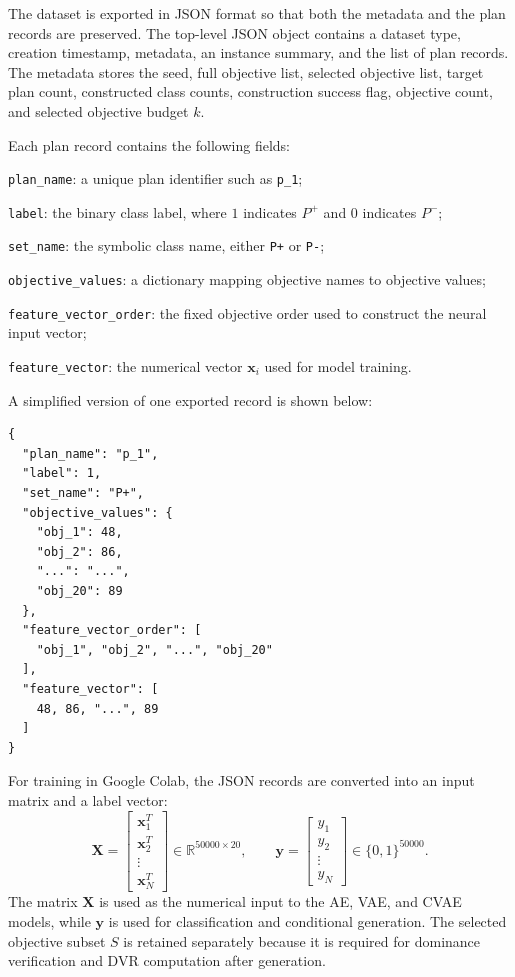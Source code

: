The dataset is exported in JSON format so that both the metadata and the plan records are preserved. The top-level JSON object contains a dataset type, creation timestamp, metadata, an instance summary, and the list of plan records. The metadata stores the seed, full objective list, selected objective list, target plan count, constructed class counts, construction success flag, objective count, and selected objective budget $k$.

Each plan record contains the following fields:
\begin{compactitem}
    \item \texttt{plan\_name}: a unique plan identifier such as \texttt{p\_1};
    \item \texttt{label}: the binary class label, where $1$ indicates $P^{+}$ and $0$ indicates $P^{-}$;
    \item \texttt{set\_name}: the symbolic class name, either \texttt{P+} or \texttt{P-};
    \item \texttt{objective\_values}: a dictionary mapping objective names to objective values;
    \item \texttt{feature\_vector\_order}: the fixed objective order used to construct the neural input vector;
    \item \texttt{feature\_vector}: the numerical vector $\mathbf{x}_i$ used for model training.
\end{compactitem}

A simplified version of one exported record is shown below:
\begin{verbatim}
{
  "plan_name": "p_1",
  "label": 1,
  "set_name": "P+",
  "objective_values": {
    "obj_1": 48,
    "obj_2": 86,
    "...": "...",
    "obj_20": 89
  },
  "feature_vector_order": [
    "obj_1", "obj_2", "...", "obj_20"
  ],
  "feature_vector": [
    48, 86, "...", 89
  ]
}
\end{verbatim}

For training in Google Colab, the JSON records are converted into an input matrix and a label vector:
\begin{equation}
    \mathbf{X}
    =
    \begin{bmatrix}
        \mathbf{x}_1^{T} \\
        \mathbf{x}_2^{T} \\
        \vdots \\
        \mathbf{x}_N^{T}
    \end{bmatrix}
    \in \mathbb{R}^{50000 \times 20},
    \qquad
    \mathbf{y}
    =
    \begin{bmatrix}
        y_1 \\
        y_2 \\
        \vdots \\
        y_N
    \end{bmatrix}
    \in \{0,1\}^{50000}.
    \label{eq:training_matrix_and_labels}
\end{equation}
The matrix $\mathbf{X}$ is used as the numerical input to the AE, VAE, and CVAE models, while $\mathbf{y}$ is used for classification and conditional generation. The selected objective subset $S$ is retained separately because it is required for dominance verification and DVR computation after generation.
